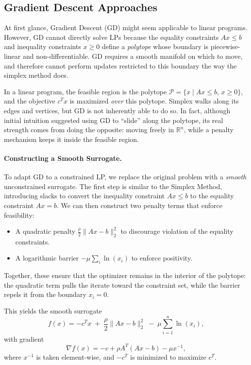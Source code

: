 \documentclass[11pt]{article}
\begin{document}
\subsection{Gradient Descent Approaches}

At first glance, Gradient Descent (GD) might seem applicable to linear programs.  
However, GD cannot directly solve LPs because the equality constraints
\(Ax \le b\) and inequality constraints \(x \ge 0\) define a \emph{polytope} whose
boundary is piecewise-linear and non-differentiable.  
GD requires a smooth manifold on which to move, and therefore cannot perform 
updates restricted to this boundary the way the simplex method does.

In a linear program, the feasible region is the polytope
\(\mathcal{P} = \{x \mid Ax \le b,\, x \ge 0\}\), and the objective
\(c^T x\) is maximized \emph{over} this polytope.  
Simplex walks along its edges and vertices, but GD is not inherently able to do so.
In fact, although initial intuition suggested using GD to “slide” along the polytope,
its real strength comes from doing the opposite: moving freely in \(\mathbb{R}^n\),
while a penalty mechanism keeps it inside the feasible region.

\paragraph{Constructing a Smooth Surrogate.}
To adapt GD to a constrained LP, we replace the original problem with a 
\emph{smooth} unconstrained surrogate. The first step is similar to the Simplex Method, introducing slacks to convert the inequality constraint \(Ax \le b\) to the equality constraint \(Ax = b\).
We can then construct two penalty terms that enforce feasibility:

\begin{itemize}
    \item A quadratic penalty \( \frac{\rho}{2}\|Ax - b\|_2^2 \) to discourage violation 
    of the equality constraints.
    \item A logarithmic barrier \( - \mu \sum_i \ln(x_i) \) to enforce positivity.
\end{itemize}

Together, these ensure that the optimizer remains in the interior of the polytope:
the quadratic term pulls the iterate toward the constraint set, while the barrier
repels it from the boundary \(x_i = 0\).

This yields the smooth surrogate
\[
    f(x) = -c^T x \;+\; \frac{\rho}{2} \|Ax - b\|_2^2 \;-\; \mu \sum_{i=1}^n \ln(x_i),
\]
with gradient
\[
    \nabla f(x)
    = -c
    + \rho A^T(Ax - b)
    - \mu x^{-1},
\]
where \(x^{-1}\) is taken element-wise, and \(-c^T\) is minimized to maximize \(c^T\).
\end{document}
